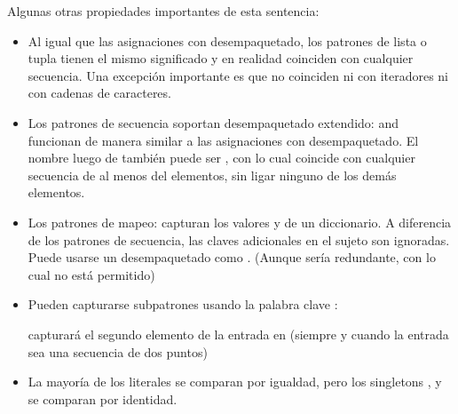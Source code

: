 \documentclass[a4,10pt,spanish]{sphinxmanual}
\begin{document}
\sphinxAtStartPar
Algunas otras propiedades importantes de esta sentencia:
\begin{itemize}
\item {} 
\sphinxAtStartPar
Al igual que las asignaciones con desempaquetado, los patrones de lista o tupla tienen el mismo significado y en realidad coinciden con cualquier secuencia. Una excepción importante es que no coinciden ni con iteradores ni con cadenas de caracteres.

\item {} 
\sphinxAtStartPar
Los patrones de secuencia soportan desempaquetado extendido: \sphinxcode{\sphinxupquote{{[}x, y, *otros{]}}} and  funcionan de manera similar a las asignaciones con desempaquetado.  El nombre luego de \sphinxcode{\sphinxupquote{*}} también puede ser \sphinxcode{\sphinxupquote{\_}}, con lo cual  coincide con cualquier secuencia de al menos del elementos, sin ligar ninguno de los demás elementos.

\item {} 
\sphinxAtStartPar
Los patrones de mapeo:  capturan los valores  y  de un diccionario.  A diferencia de los patrones de secuencia, las claves adicionales en el sujeto son ignoradas.  Puede usarse un desempaquetado como  .  (Aunque \sphinxcode{\sphinxupquote{**\_}} sería redundante, con lo cual no está permitido)

\item {} 
\sphinxAtStartPar
Pueden capturarse subpatrones usando la palabra clave :

\begin{sphinxVerbatim}[commandchars=\\\{\}]
       
\end{sphinxVerbatim}

\sphinxAtStartPar
capturará el segundo elemento de la entrada en  (siempre y cuando la entrada sea una secuencia de dos puntos)

\item {} 
\sphinxAtStartPar
La mayoría de los literales se comparan por igualdad, pero los singletons ,  y  se comparan por identidad.


\end{itemize}
\end{document}

